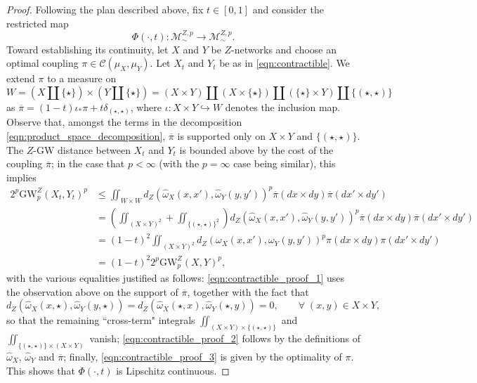 \documentclass[twoside,11pt]{article}
\theoremstyle{definition}
\newcommand{\M}{\mathcal{M}}
\newcommand{\MZp}{\M_{\sim}^{Z,p}}
\newcommand{\dgwz}{\mathrm{GW}_p^Z}
\begin{document}
\begin{proof}
 \smallskip
  Following the plan described above, fix $t \in [0,1]$ and consider the restricted map
 \[
 \Phi(\cdot,t):\MZp \to \MZp.
 \]
 Toward establishing its continuity, let $X$ and $Y$ be $Z$-networks and choose an optimal coupling $\pi \in \mathcal{C}(\mu_X,\mu_Y)$. Let $X_t$ and $Y_t$ be as in \eqref{eqn:contractible}. We extend $\pi$ to a measure on 
 \begin{equation}\label{eqn:product_space_decomposition}
 W = (X \amalg \{\star\}) \times (Y \amalg \{\star\}) = (X \times Y) \amalg (X \times \{\star\}) \amalg (\{\star\} \times Y) \amalg \{(\star,\star)\}
 \end{equation}
 as $\overline{\pi} = (1-t) \iota_\ast \pi + t \delta_{(\star,\star)}$, where $\iota:X \times Y \hookrightarrow W$ denotes the inclusion map. Observe that, amongst the terms in the decomposition \eqref{eqn:product_space_decomposition}, $\overline{\pi}$ is supported only on $X \times Y$ and $\{(\star,\star)\}$.
 The $Z$-GW distance between $X_t$ and $Y_t$ is bounded above by the cost of the coupling $\overline{\pi}$; in the case that $p < \infty$ (with the $p=\infty$ case being similar), this implies
{\small
 \begin{align}
     2^p\dgwz(X_t,Y_t)^p &\leq \iint_{W \times W} d_Z(\hat{\omega}_X(x,x'),\hat{\omega}_Y(y,y'))^p \overline{\pi}(dx \times dy) \overline{\pi}(dx' \times dy') \\
     &= \left(\iint_{(X \times Y)^2} + \iint_{\{(\star,\star)\}^2} \right)d_Z(\hat{\omega}_X(x,x'),\hat{\omega}_Y(y,y'))^p \overline{\pi}(dx \times dy) \overline{\pi}(dx' \times dy')  \label{eqn:contractible_proof_1} \\
     &= (1-t)^2 \iint_{(X \times Y)^2} d_Z(\omega_X(x,x'),\omega_Y(y,y'))^p \pi(dx \times dy) \pi(dx' \times dy') \label{eqn:contractible_proof_2} \\
     &= (1-t)^2 2^p\dgwz(X,Y)^p, \label{eqn:contractible_proof_3}
 \end{align}}with the various equalities justified as follows:  \eqref{eqn:contractible_proof_1} uses the observation above on the support of $\overline{\pi}$, together with the fact that 
 \[
 d_Z(\hat{\omega}_X(x,\star),\hat{\omega}_Y(y,\star)) = d_Z(\hat{\omega}_X(\star,x),\hat{\omega}_Y(\star,y)) = 0, \qquad \forall \;(x,y) \in X \times Y,
 \] 
 so that the remaining ``cross-term" integrals $\iint_{(X\times Y) \times \{(\star,\star)\}}$ and $\iint_{\{(\star,\star)\} \times (X\times Y)}$ vanish; \eqref{eqn:contractible_proof_2} follows by the definitions of $\hat{\omega}_X$, $\hat{\omega}_Y$ and $\overline{\pi}$; finally,  \eqref{eqn:contractible_proof_3} is given by the optimality of $\pi$. This shows that $\Phi(\cdot,t)$ is Lipschitz continuous.


\end{proof}
\end{document}
